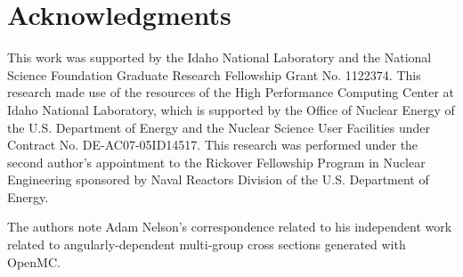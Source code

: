 \section*{Acknowledgments}


This work was supported by the Idaho National Laboratory and the National Science Foundation Graduate Research Fellowship Grant No. 1122374. This research made use of the resources of the High Performance Computing Center at Idaho National Laboratory, which is supported by the Office of Nuclear Energy of the U.S. Department of Energy and the Nuclear Science User Facilities under Contract No. DE-AC07-05ID14517.  This research was performed under the second author's appointment to the Rickover Fellowship Program in Nuclear Engineering sponsored by Naval Reactors Division of the U.S. Department of Energy.

The authors note Adam Nelson's correspondence related to his independent work related to angularly-dependent multi-group cross sections generated with OpenMC.
